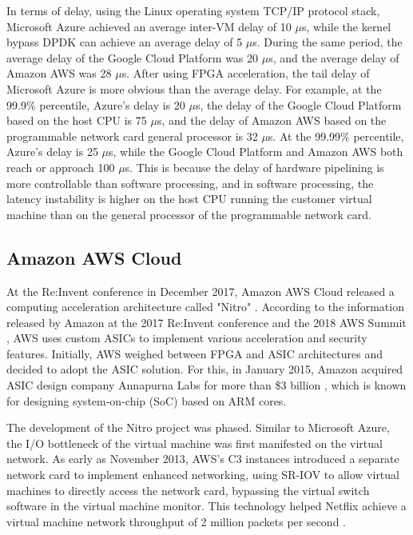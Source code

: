 In terms of delay, using the Linux operating system TCP/IP protocol stack, Microsoft Azure achieved an average inter-VM delay of 10 $\mu$s, while the kernel bypass DPDK \cite{dpdk} can achieve an average delay of 5 $\mu$s. During the same period, the average delay of the Google Cloud Platform was 20 $\mu$s, and the average delay of Amazon AWS was 28 $\mu$s. After using FPGA acceleration, the tail delay of Microsoft Azure is more obvious than the average delay. For example, at the 99.9\% percentile, Azure's delay is 20 $\mu$s, the delay of the Google Cloud Platform based on the host CPU is 75 $\mu$s, and the delay of Amazon AWS based on the programmable network card general processor is 32 $\mu$s. At the 99.99\% percentile, Azure's delay is 25 $\mu$s, while the Google Cloud Platform and Amazon AWS both reach or approach 100 $\mu$s. This is because the delay of hardware pipelining is more controllable than software processing, and in software processing, the latency instability is higher on the host CPU running the customer virtual machine than on the general processor of the programmable network card.

\subsection{Amazon AWS Cloud}

At the Re:Invent conference in December 2017, Amazon AWS Cloud released a computing acceleration architecture called "Nitro" \cite{nitro-blog}. According to the information released by Amazon at the 2017 Re:Invent conference and the 2018 AWS Summit \cite{nitro-talk,nitro-web}, AWS uses custom ASICs to implement various acceleration and security features. Initially, AWS weighed between FPGA and ASIC architectures and decided to adopt the ASIC solution. For this, in January 2015, Amazon acquired ASIC design company Annapurna Labs for more than \$3 billion \cite{annapurna}, which is known for designing system-on-chip (SoC) based on ARM cores.

The development of the Nitro project was phased. Similar to Microsoft Azure, the I/O bottleneck of the virtual machine was first manifested on the virtual network. As early as November 2013, AWS's C3 instances introduced a separate network card to implement enhanced networking, using SR-IOV to allow virtual machines to directly access the network card, bypassing the virtual switch software in the virtual machine monitor. This technology helped Netflix achieve a virtual machine network throughput of 2 million packets per second \cite{netflix-aws}.

